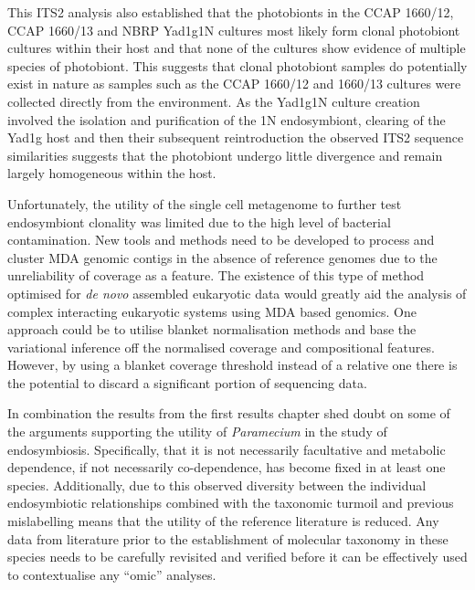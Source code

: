 This ITS2 analysis also established that 
the photobionts in the CCAP 1660/12, CCAP 1660/13
and NBRP Yad1g1N cultures most likely form
clonal photobiont cultures within their host and that none
of the cultures show evidence of multiple species of photobiont.
This suggests that clonal photobiont samples do potentially exist
in nature as samples such as the CCAP 1660/12 and 1660/13
cultures were collected directly from the environment.  
As the Yad1g1N culture creation involved
the isolation and purification of the 1N endosymbiont, 
clearing of the Yad1g host and then their subsequent
reintroduction the observed ITS2 sequence similarities
suggests that the photobiont
undergo little divergence and remain largely
homogeneous within the host.

Unfortunately, the utility of the single cell metagenome to further
test endosymbiont clonality was limited due to 
the high level of bacterial contamination.
New tools and methods need to be developed to process and cluster
MDA genomic contigs in the absence of reference genomes
due to the unreliability of coverage as a feature.  The existence
of this type of method optimised for \textit{de novo} assembled eukaryotic data
would greatly aid the analysis of complex interacting eukaryotic
systems using MDA based genomics.   One approach could be to utilise
blanket normalisation methods and base the variational inference
off the normalised coverage and compositional features. However,
by using a blanket coverage threshold instead of a relative one
there is the potential to discard a significant portion of sequencing
data.


In combination the results from the first results chapter 
shed doubt on some of the arguments supporting the utility of
\textit{Paramecium} in the study of endosymbiosis. Specifically,
that it is not necessarily facultative and metabolic dependence, if not
necessarily co-dependence, has become fixed in at least one
species.  Additionally, due to this observed diversity
between the individual endosymbiotic relationships
combined with the taxonomic turmoil and previous
mislabelling means that the utility of the reference literature
is reduced. Any data from literature prior to the establishment
of molecular taxonomy in these species needs to be carefully
revisited and verified before it can be effectively used to
contextualise any ``omic'' analyses.


